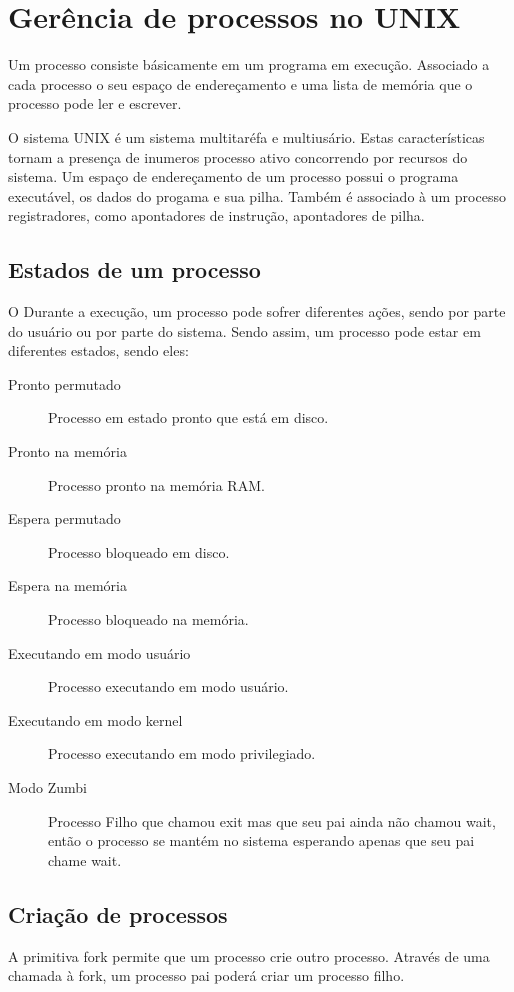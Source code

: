 \chapter{Gerência de processos no UNIX}

Um processo consiste básicamente em um programa em execução. Associado a cada processo o seu espaço de endereçamento e uma lista de memória que o processo pode ler e escrever.

O sistema UNIX é um sistema multitaréfa e multiusário. Estas características tornam a presença de inumeros processo ativo concorrendo por recursos do sistema. Um espaço de endereçamento de um processo possui o programa executável, os dados do progama e sua pilha. Também é associado à um processo registradores, como apontadores de instrução, apontadores de pilha.

\section{Estados de um processo}

O Durante a execução, um processo pode sofrer diferentes ações, sendo por parte do usuário ou por parte do sistema. Sendo assim, um processo pode estar em diferentes estados, sendo eles:

\begin{description}
\item[Pronto permutado] Processo em estado pronto que está em disco.
\item[Pronto na memória] Processo pronto na memória RAM.
\item[Espera permutado] Processo bloqueado em disco.
\item[Espera na memória] Processo bloqueado na memória.
\item[Executando em modo usuário] Processo executando em modo usuário.
\item[Executando em modo kernel] Processo executando em modo privilegiado.
\item[Modo Zumbi] Processo Filho que chamou exit mas que seu pai ainda não chamou wait, então o processo se mantém no sistema esperando apenas que seu pai chame wait.
\end{description}

\section{Criação de processos}

A primitiva fork permite que um processo crie outro processo. Através de uma chamada à fork, um processo pai poderá criar um processo filho.

